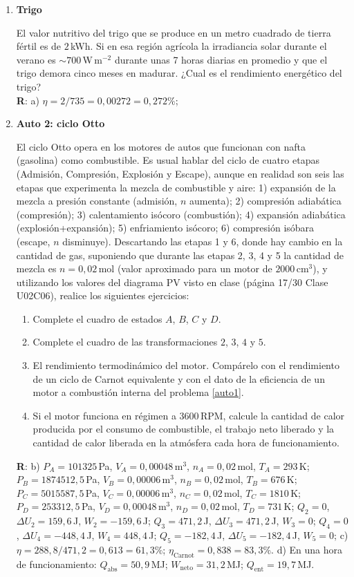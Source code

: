 \documentclass[a4paper,12pt]{article}
\begin{document}
\begin{enumerate}
	\item {\bf{Trigo}}
		
		El valor nutritivo del trigo que se produce en un metro cuadrado de
		tierra fértil es de $2$\,kWh. Si en esa región agrícola la irradiancia solar
		durante el verano es $\sim 700$\,W\,m$^{-2}$ durante unas 7 horas
		diarias en promedio y que el trigo demora cinco meses en madurar.  
		¿Cual es el rendimiento energético del trigo? 
		\\{\bf{R}}: a) $\eta=2/735=0,00272 = 0,272\%$;

	\item {\bf{Auto 2: ciclo Otto}}
		
		El ciclo Otto opera en los motores de autos que funcionan con nafta
		(gasolina) como combustible. Es usual hablar del ciclo de cuatro etapas
		(Admisión, Compresión, Explosión y Escape), aunque en realidad son seis
		las etapas que experimenta la mezcla de combustible y aire: 1)
		expansión de la mezcla a presión constante (admisión, $n$ aumenta); 2)
		compresión adiabática (compresión); 3) calentamiento isócoro
		(combustión); 4) expansión adiabática (explosión+expansión); 5)
		enfriamiento isócoro; 6) compresión isóbara (escape, $n$ disminuye).
		Descartando las etapas 1 y 6, donde hay cambio en la cantidad de gas,
		suponiendo que durante las etapas 2, 3, 4 y 5 la cantidad de mezcla es
		$n=0,02$\,mol (valor aproximado para un motor de $2000$\,cm$^3$), y
		utilizando los valores del diagrama PV visto en clase (página 17/30
		Clase U02C06), realice los siguientes ejercicios:  
		\begin{enumerate}
			\item Complete el cuadro de estados $A$, $B$, $C$ y $D$. 
			\item Complete el cuadro de las transformaciones $2$, $3$, $4$ y
				$5$.  
			\item El rendimiento termodinámico del motor. Compárelo con el
				rendimiento de un ciclo de Carnot equivalente y con el dato de
				la eficiencia de un motor a combustión interna del problema
				\ref{auto1}.
			\item Si el motor funciona en régimen a $3600$\,RPM, calcule la
				cantidad de calor producida por el consumo de combustible, el
				trabajo neto liberado y la cantidad de calor liberada en la
				atmósfera cada hora de funcionamiento.		
		\end{enumerate}
		{\bf{R}}: 
		b)
		$P_A=101325$\,Pa, $V_A=0,00048$\,m$^3$, $n_A=0,02$\,mol, $T_A=293$\,K; 
		$P_B=1874512,5$\,Pa, $V_B=0,00006$\,m$^3$, $n_B=0,02$\,mol, $T_B=676$\,K; 
		$P_C=5015587,5$\,Pa, $V_C=0,00006$\,m$^3$, $n_C=0,02$\,mol, $T_C=1810$\,K; 
		$P_D=253312,5$\,Pa, $V_D=0,00048$\,m$^3$, $n_D=0,02$\,mol, $T_D=731$\,K;
		$Q_2=0$, $\Delta U_2=159,6$\,J, $W_2=-159,6$\,J;
		$Q_3=471,2$\,J, $\Delta U_3=471,2$\,J, $W_3=0$;
		$Q_4=0$, $\Delta U_4=-448,4$\,J, $W_4=448,4$\,J;
		$Q_5=-182,4$\,J, $\Delta U_5=-182,4$\,J, $W_5=0$;
		c)
		$\eta=288,8/471,2 = 0,613 = 61,3\%$; $\eta_{\mathrm{Carnot}} = 0,838 = 83,3\%$.
		d) En una hora de funcionamiento: $Q_{\mathrm{abs}}=50,9$\,MJ;
		$W_{\mathrm{neto}}=31,2$\,MJ; $Q_{\mathrm{ent}}=19,7$\,MJ.


\end{enumerate}
\end{document}
